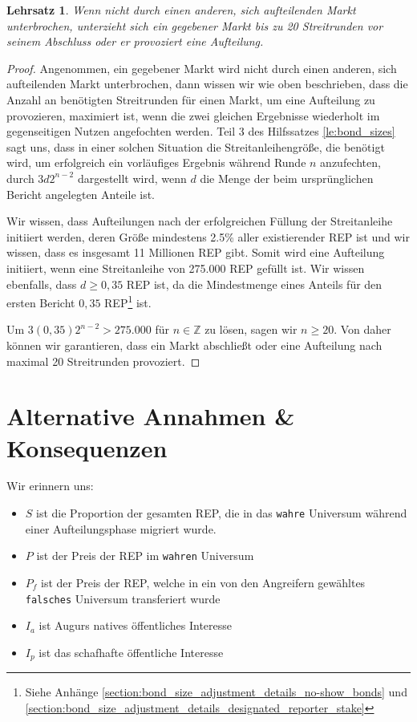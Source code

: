 \documentclass[floatfix,reprint,nofootinbib,amsmath,amssymb,epsfig,pre,floats,letterpaper,groupedaffiliation]{revtex4-1}
\newtheorem{theorem}{Lehrsatz}
\theoremstyle{definition}
\theoremstyle{definition}
\theoremstyle{definition}
\begin{document}
\begin{appendix}
\begin{theorem}\label{th:twenty_rounds}
Wenn nicht durch einen anderen, sich aufteilenden Markt unterbrochen, unterzieht sich ein gegebener Markt bis zu 20 Streitrunden vor seinem Abschluss oder er provoziert eine Aufteilung.
\end{theorem}

\begin{proof}
Angenommen, ein gegebener Markt wird nicht durch einen anderen, sich aufteilenden Markt unterbrochen, dann wissen wir wie oben beschrieben, dass die Anzahl an benötigten Streitrunden für einen Markt, um eine Aufteilung zu provozieren, maximiert ist, wenn die zwei gleichen Ergebnisse wiederholt im gegenseitigen Nutzen angefochten werden. Teil 3 des Hilfssatzes \ref{le:bond_sizes} sagt uns, dass in einer solchen Situation die Streitanleihengröße, die benötigt wird, um erfolgreich ein vorläufiges Ergebnis während Runde $n$ anzufechten, durch $3d2^{n-2}$ dargestellt wird, wenn $d$ die Menge der beim ursprünglichen Bericht angelegten Anteile ist.

Wir wissen, dass Aufteilungen nach der erfolgreichen Füllung der Streitanleihe initiiert werden, deren Größe mindestens 2.5\% aller existierender REP ist und wir wissen, dass es insgesamt 11 Millionen REP gibt. Somit wird eine Aufteilung initiiert, wenn eine Streitanleihe von 275.000 REP gefüllt ist. Wir wissen ebenfalls, dass $d \geq 0,35$ REP ist, da die Mindestmenge eines Anteils für den ersten Bericht $0,35$ REP\footnote{Siehe Anhänge \ref{section:bond_size_adjustment_details_no-show_bonds} und \ref{section:bond_size_adjustment_details_designated_reporter_stake}} ist.

Um $3(0,35)2^{n-2}>275.000$ für $n \in \mathbb{Z}$ zu lösen, sagen wir $n \geq 20$. Von daher können wir garantieren, dass ein Markt abschließt oder eine Aufteilung nach maximal 20 Streitrunden provoziert.
\end{proof}

\section{Alternative Annahmen \& Konsequenzen}\label{section:alternative_assumptions}

Wir erinnern uns:
\begin{itemize}
\item{$S$ ist die Proportion der gesamten REP, die in das \texttt{wahre} Universum während einer Aufteilungsphase migriert wurde.}
\item{$P$ ist der Preis der REP im \texttt{wahren} Universum}
\item{$P_{f}$ ist der Preis der REP, welche in ein von den Angreifern gewähltes \texttt{falsches} Universum transferiert wurde}
\item{$I_{a}$ ist Augurs natives öffentliches Interesse}
\item{$I_{p}$ ist das schafhafte öffentliche Interesse}
\end{itemize}


\end{appendix}
\end{document}
